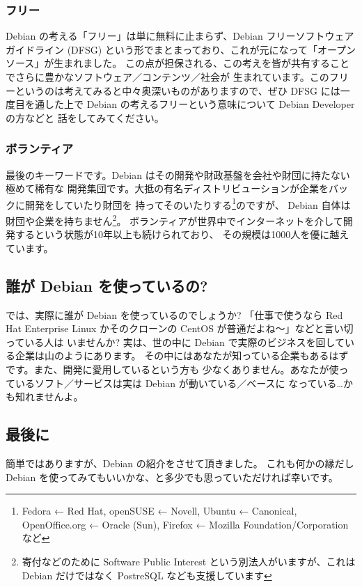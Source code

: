 \documentclass[mingoth,a4paper]{jsarticle}
\begin{document}
\subsubsection{フリー}
Debian の考える「フリー」は単に無料に止まらず、Debian フリーソフトウェアガイドライン
 (DFSG) という形でまとまっており、これが元になって「オープンソース」が生まれました。
この点が担保される、この考えを皆が共有することでさらに豊かなソフトウェア／コンテンツ／社会が
生まれています。このフリーというのは考えてみると中々奥深いものがありますので、ぜひ DFSG 
には一度目を通した上で Debian の考えるフリーという意味について Debian Developer の方などと
話をしてみてください。

\subsubsection{ボランティア}
最後のキーワードです。Debian はその開発や財政基盤を会社や財団に持たない極めて稀有な
開発集団です。大抵の有名ディストリビューションが企業をバックに開発をしていたり財団を
持ってそのいたりする\footnote{Fedora ← Red Hat, openSUSE ← Novell, Ubuntu ← Canonical, 
OpenOffice.org ← Oracle (Sun), Firefox ← Mozilla Foundation/Corporation など}のですが、
Debian 自体は財団や企業を持ちません\footnote{寄付などのために Software Public Interest 
という別法人がいますが、これは Debian だけではなく PostreSQL なども支援しています}。
ボランティアが世界中でインターネットを介して開発するという状態が10年以上も続けられており、
その規模は1000人を優に越えています。

\subsection{誰が Debian を使っているの?}
では、実際に誰が Debian を使っているのでしょうか? 「仕事で使うなら Red Hat 
Enterprise Linux かそのクローンの CentOS が普通だよね〜」などと言い切っている人は
いませんか? 実は、世の中に Debian で実際のビジネスを回している企業は山のようにあります。
その中にはあなたが知っている企業もあるはずです。また、開発に愛用しているという方も
少なくありません。あなたが使っているソフト／サービスは実は Debian が動いている／ベースに
なっている…かも知れませんよ。

\subsection{最後に}
簡単ではありますが、Debian の紹介をさせて頂きました。
これも何かの縁だし Debian を使ってみてもいいかな、と多少でも思っていただければ幸いです。
\end{document}

